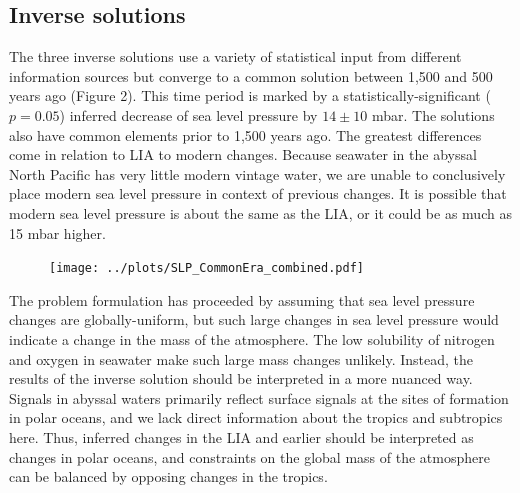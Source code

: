 \documentclass[12pt]{article}
\begin{document}
\subsection{Inverse solutions}

The three inverse solutions use a variety of statistical input from
different information sources but converge to a common solution
between 1,500 and 500 years ago (Figure 2). This time period is marked
by a statistically-significant ($p=0.05$) inferred decrease of sea
level pressure by $14 \pm 10$ mbar. The solutions also have common
elements prior to 1,500 years ago.  The greatest differences come in
relation to LIA to modern changes. Because seawater in the abyssal
North Pacific has very little modern vintage water, we are unable to
conclusively place modern sea level pressure in context of previous
changes. It is possible that modern sea level pressure is about the
same as the LIA, or it could be as much as 15 mbar higher.

\begin{figure}[htbp]
 \begin{center}
 \texttt{[image: ../plots/SLP\_CommonEra\_combined.pdf]} \\
  \end{center}
\end{figure}

The problem formulation has proceeded by assuming that sea level
pressure changes are globally-uniform, but such large changes in sea
level pressure would indicate a change in the mass of the
atmosphere. The low solubility of nitrogen and oxygen in seawater make
such large mass changes unlikely. Instead, the results of the inverse
solution should be interpreted in a more nuanced way. Signals in
abyssal waters primarily reflect surface signals at the sites of
formation in polar oceans, and we lack direct information about the
tropics and subtropics here. Thus, inferred changes in the LIA and
earlier should be interpreted as changes in polar oceans, and
constraints on the global mass of the atmosphere can be balanced by
opposing changes in the tropics.
\end{document}
